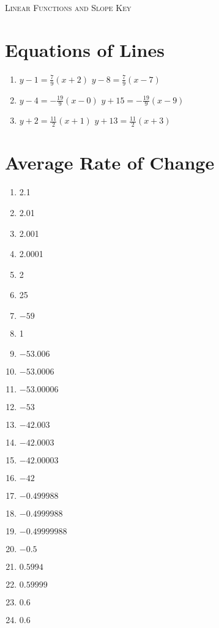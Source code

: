 \newpage

\textsc{Linear Functions and Slope Key}

\section*{Equations of Lines}
\begin{enumerate}
\item $y-1 = \frac{7}{9}(x+2)$  $y-8=\frac{7}{9}(x-7)$
    \item $y-4 = -\frac{19}{9}(x-0)$  $y+15=-\frac{19}{9}(x-9)$
    \item $y+2 = \frac{11}{2}(x+1)$  $y+13=\frac{11}{2}(x+3)$
\end{enumerate}

\section*{Average Rate of Change}
\begin{enumerate}
\item 2.1
\item 2.01
\item 2.001
\item 2.0001
\item 2
\item 25
\item $-59$
\item 1
\item $-53.006$
\item $-53.0006$
\item $-53.00006$
\item $-53$
\item $-42.003$
\item $-42.0003$
\item $-42.00003$
\item $-42$
\item $-0.499988$
\item $-0.4999988$
\item $-0.49999988$
\item $-0.5$
\item $0.5994$
\item $0.59999$
\item $0.6$
\item $0.6$
\end{enumerate}